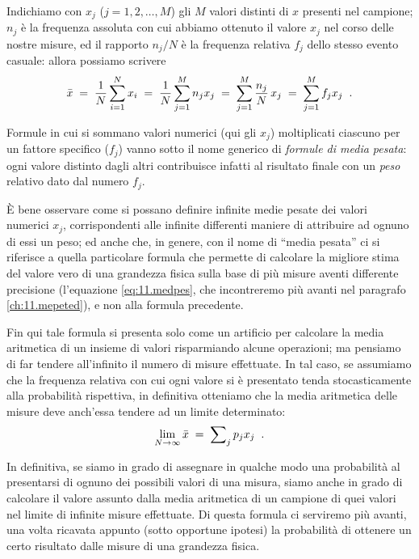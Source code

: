 Indichiamo con $x_j$ ($j = 1, 2, \ldots, M$) gli $M$ valori
distinti di $x$ presenti nel campione; $n_j$ \`e la
frequenza assoluta con cui abbiamo ottenuto il valore $x_j$
nel corso delle nostre misure, ed il rapporto $n_j / N$ \`e
la frequenza relativa $f_j$ dello stesso evento casuale:
allora possiamo scrivere
\begin{equation*}
  \bar x \; = \; \frac{1}{N} \sum_{i=1}^N x_i \; = \;
  \frac{1}{N} \sum_{j=1}^M n_j x_j \; = \;
  \sum_{j=1}^M \frac{n_j}{N} \, x_j \; = \;
  \sum_{j=1}^M f_j x_j \;\; .
\end{equation*}

%
Formule in cui si sommano valori numerici (qui gli $x_j$)
moltiplicati ciascuno per un fattore specifico ($f_j$) vanno
sotto il nome generico di \emph{formule di media pesata}:
ogni valore distinto dagli altri contribuisce infatti al
risultato finale con un \emph{peso} relativo dato dal numero
$f_j$.

\`E bene osservare come si possano definire infinite medie
pesate dei valori numerici $x_j$, corrispondenti alle
infinite differenti maniere di attribuire ad ognuno di essi
un peso; ed anche che, in genere, con il nome di ``media
pesata'' ci si riferisce a quella particolare formula che
permette di calcolare la migliore stima del valore vero di
una grandezza fisica sulla base di pi\`u misure aventi
differente precisione (l'equazione \eqref{eq:11.medpes}, che
incontreremo pi\`u avanti nel paragrafo
\ref{ch:11.mepeted}), e non alla formula precedente.%

%
Fin qui tale formula si presenta solo come un artificio per
calcolare la media aritmetica di un insieme di valori
risparmiando alcune operazioni; ma pensiamo di far tendere
all'infinito il numero di misure effettuate.  In tal caso,
se assumiamo che la frequenza relativa con cui ogni valore
si \`e presentato tenda stocasticamente alla probabilit\`a
rispettiva, in definitiva otteniamo che la media aritmetica
delle misure deve anch'essa tendere ad un limite
determinato:
\begin{equation*}%
\index{media!aritmetica!come stima del valore vero}
  \lim_{N \rightarrow \infty} \bar x \; = \;
  \sum \nolimits_j p_j x_j \peq .
\end{equation*}

In definitiva, se siamo in grado di assegnare in qualche
modo una probabilit\`a al presentarsi di ognuno dei
possibili valori di una misura, siamo anche in grado di
calcolare il valore assunto dalla media aritmetica di un
campione di quei valori nel limite di infinite misure
effettuate.%
Di questa formula ci serviremo pi\`u avanti, una volta
ricavata appunto (sotto opportune ipotesi) la probabilit\`a
di ottenere un certo risultato dalle misure di una grandezza
fisica.

